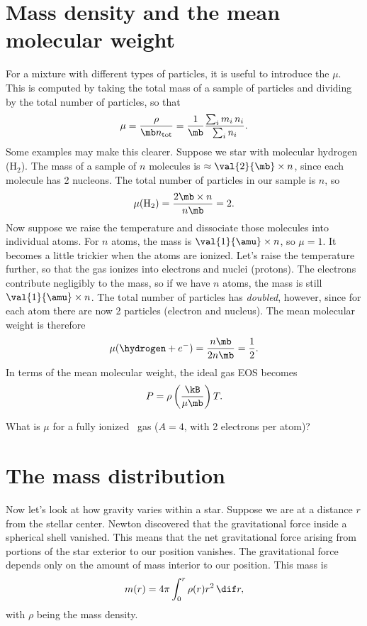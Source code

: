 \section{Mass density and the mean molecular weight}
\label{s.mean-molecular-weight}

For a mixture with different types of particles, it is useful to introduce the  $\mu$. This is computed by taking the total mass of a sample of particles and dividing by the total number of particles, so that
\begin{equation}\label{e.mean-mol-weight}
\mu = \frac{\rho}{\mb n_{\mathrm{tot}}} = \frac{1}{\mb}\frac{\sum_{i}m_{i}\,n_{i}}{\sum_{i}n_{i}}.
\end{equation}
Some examples may make this clearer. Suppose we star with molecular hydrogen ($\mathrm{H}_{2}$). The mass of a sample of $n$ molecules is $\approx \val{2}{\mb}\times n$, since each molecule has 2 nucleons. The total number of particles in our sample is $n$, so
\[
	\mu(\mathrm{H_{2}}) = \frac{2\mb \times n}{n\mb} = 2.
\]
Now suppose we raise the temperature and dissociate those molecules into individual atoms. For $n$ atoms, the mass is $\val{1}{\amu}\times n$, so $\mu = 1$. It becomes a little trickier when the atoms are ionized. Let's raise the temperature further, so that the gas ionizes into electrons and nuclei (protons). The electrons contribute negligibly to the mass, so if we have $n$ atoms, the mass is still $\val{1}{\amu}\times n$. The total number of particles has \emph{doubled}, however, since for each atom there are now 2 particles (electron and nucleus). The mean molecular weight is therefore
\[
	\mu(\hydrogen + e^{-}) = \frac{n\mb}{2n\mb} = \frac{1}{2}.
\]
In terms of the mean molecular weight, the ideal gas EOS becomes
\begin{equation}\label{e.eos}
P = \rho\left(\frac{\kB}{\mu\mb}\right) T.
\end{equation}

\begin{exercisebox}
What is $\mu$ for a fully ionized \helium\ gas ($A=4$, with 2 electrons per atom)? 
\end{exercisebox}

\section{The mass distribution}

Now let's look at how gravity varies within a star. Suppose we are at a distance $r$ from the stellar center. Newton discovered that the gravitational force inside a spherical shell vanished. This means that the net gravitational force arising from portions of the star exterior to our position vanishes. The gravitational force depends only on the amount of mass interior to our position. This mass is
\begin{equation}\label{e.mass-continuity}
	m(r) = 4\pi \int_{0}^{r}\rho(r)r^{2}\,\dif r,
\end{equation}
with $\rho$ being the mass density.


